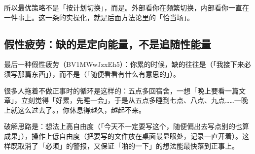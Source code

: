 所以最优策略不是「按计划切换」，而是。外部看你在频繁切换，内部看你一直在一件事上。这一条的实操化，就是后面方法论里的「恰当场」。

\subsection{假性疲劳：缺的是定向能量，不是追随性能量}

最后一种假性疲劳（BV1MWwJzxEh5）：你累的时候，缺的往往是（「我接下来必须写那篇东西」），而不是（「随便看看有什么有意思的」）。

很多人拖着不做正事时的循环是这样的：五点多回宿舍，一想「晚上要看一篇文章」，立刻觉得「好累，先睡一会」，于是从五点多睡到七点、八点、九点……一晚上就这么过去了。，你休息得越久，越起不来。

破解思路是：想法上高自由度（「今天不一定要写这个，随便偏出去写点别的也算成果」），操作上低自由度（把要写的文件放在桌面最显眼处，记录一直开着）。这样既取消了「必须」的警报，又保证「啪的一下」的想法能最快落到正事上。

